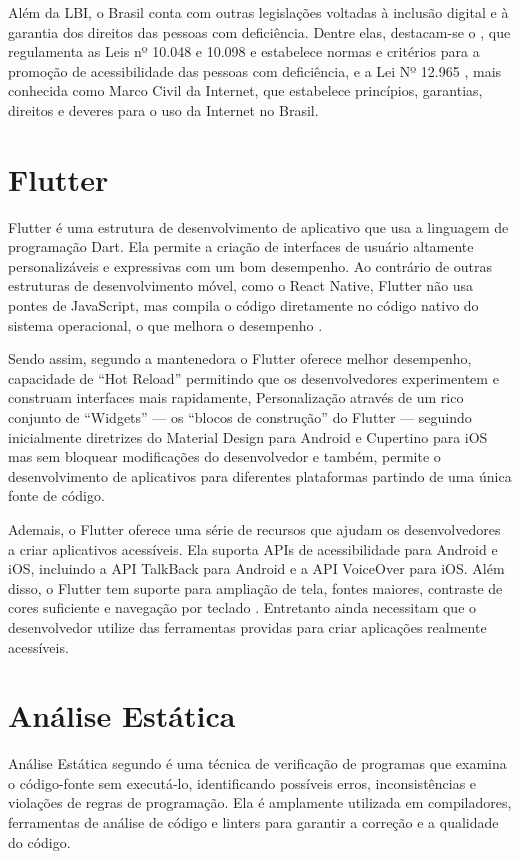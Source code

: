 Além da LBI, o Brasil conta com outras legislações voltadas à inclusão digital e à garantia dos direitos das pessoas com deficiência. Dentre elas, destacam-se o \cite{decreto5296}, que regulamenta as Leis nº 10.048 e 10.098 e estabelece normas e critérios para a promoção de acessibilidade das pessoas com deficiência, e a Lei Nº 12.965 \cite{lei12965}, mais conhecida como Marco Civil da Internet, que estabelece princípios, garantias, direitos e deveres para o uso da Internet no Brasil.

\section{Flutter}

Flutter é uma estrutura de desenvolvimento de aplicativo que usa a linguagem de programação Dart. Ela permite a criação de interfaces de usuário altamente personalizáveis e expressivas com um bom desempenho. Ao contrário de outras estruturas de desenvolvimento móvel, como o React Native, Flutter não usa pontes de JavaScript, mas compila o código diretamente no código nativo do sistema operacional, o que melhora o desempenho \cite{flutter}.

Sendo assim, segundo a mantenedora o Flutter oferece melhor desempenho, capacidade de “Hot Reload” permitindo que os desenvolvedores experimentem e construam interfaces mais rapidamente, Personalização através de um rico conjunto de “Widgets” --- os “blocos de construção” do Flutter --- seguindo inicialmente diretrizes do Material Design para Android e Cupertino para iOS mas sem bloquear modificações do desenvolvedor e também, permite o desenvolvimento de aplicativos para diferentes plataformas partindo de uma única fonte de código.

Ademais, o Flutter oferece uma série de recursos que ajudam os desenvolvedores a criar aplicativos acessíveis. Ela suporta APIs de acessibilidade para Android e iOS, incluindo a API TalkBack para Android e a API VoiceOver para iOS. Além disso, o Flutter tem suporte para ampliação de tela, fontes maiores, contraste de cores suficiente e navegação por teclado \cite{flutter}. Entretanto ainda necessitam que o desenvolvedor utilize das ferramentas providas para criar aplicações realmente acessíveis.

\section{Análise Estática}

Análise Estática segundo \cite{interpreters} é uma técnica de verificação de programas que examina o código-fonte sem executá-lo, identificando possíveis erros, inconsistências e violações de regras de programação. Ela é amplamente utilizada em compiladores, ferramentas de análise de código e linters para garantir a correção e a qualidade do código.

